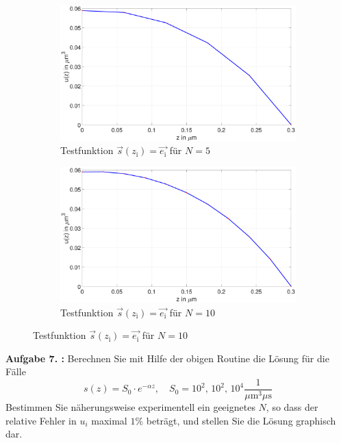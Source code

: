 \begin{figure}
\begin{subfigure}[b]{.5\textwidth}
		\includegraphics[width=1\linewidth]{figures/station_gl_2_1/aufgabe_7_test_n5}
		\caption{Testfunktion $\vec{s}(z_\mathrm{i})=\vec{e_\mathrm{i}}$ für
			$N=5$}
	\end{subfigure}
	\begin{subfigure}[b]{.5\textwidth}
		\centering

		\includegraphics[width=1\linewidth]{figures/station_gl_2_1/aufgabe_7_test_n10}
		\caption{Testfunktion $\vec{s}(z_\mathrm{i})=\vec{e_\mathrm{i}}$ für
			$N=10$}
	\end{subfigure}
\end{figure}
\begin{mybox}
	\textbf{Aufgabe 7. :}	Berechnen Sie mit Hilfe der obigen Routine die Lösung
	für die Fälle
	\begin{equation}
		s(z)=S_0\cdot e^{-\alpha z}, \quad S_0=10^2, \, 10^2, \, 10^4
		\frac{1}{\si{\mu\meter^3 \mu \s}}
	\end{equation}
	Bestimmen Sie näherungsweise experimentell ein geeignetes $N$, so dass der
	relative Fehler in $u_i$
	maximal $1\%$ beträgt, und stellen Sie die Lösung graphisch dar.
\end{mybox}
\begin{figure}

	
\end{figure}

